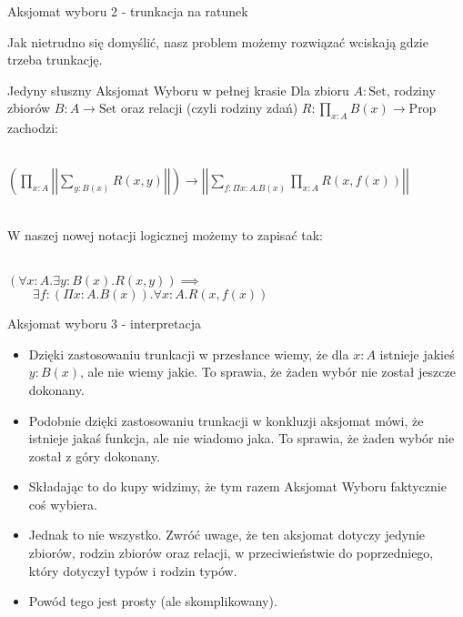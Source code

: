 \documentclass{beamer}
\newcommand{\Prop}{\text{Prop}}
\newcommand{\Set}{\text{Set}}
\begin{document}
\begin{frame}{Aksjomat wyboru 2 - trunkacja na ratunek}

Jak nietrudno się domyślić, nasz problem możemy rozwiązać wciskają gdzie trzeba trunkację.

\begin{block}{Jedyny słuszny Aksjomat Wyboru w pełnej krasie}
Dla zbioru $A : \Set$, rodziny zbiorów $B : A \to \Set$ oraz relacji (czyli rodziny zdań) $R : \prod_{x : A} B(x) \to \Prop$ zachodzi: \\~\

$\displaystyle
	\left(\prod_{x : A} \left|\left|\sum_{y : B(x)} R(x, y)\right|\right|\right) \to
	\left|\left|\sum_{f : \Pi x : A. B(x)} \prod_{x : A} R(x, f(x))\right|\right|
$ \\~\

W naszej nowej notacji logicznej możemy to zapisać tak: \\~\

$\displaystyle
	(\forall x : A. \exists y : B(x). R(x, y)) \implies
$ \\
$\displaystyle \qquad
	\exists f : (\Pi x : A. B(x)). \forall x : A. R(x, f(x))
$
\end{block}

\end{frame}

\begin{frame}{Aksjomat wyboru 3 - interpretacja}
\begin{itemize}
	\item Dzięki zastosowaniu trunkacji w przesłance wiemy, że dla $x : A$ istnieje jakieś $y : B(x)$, ale nie wiemy jakie. To sprawia, że żaden wybór nie został jeszcze dokonany.
	\item Podobnie dzięki zastosowaniu trunkacji w konkluzji aksjomat mówi, że istnieje jakaś funkcja, ale nie wiadomo jaka. To sprawia, że żaden wybór nie został z góry dokonany.
	\item Składając to do kupy widzimy, że tym razem Aksjomat Wyboru faktycznie coś wybiera.
	\item Jednak to nie wszystko. Zwróć uwage, że ten aksjomat dotyczy jedynie zbiorów, rodzin zbiorów oraz relacji, w przeciwieństwie do poprzedniego, który dotyczył typów i rodzin typów.
	\item Powód tego jest prosty (ale skomplikowany).
\end{itemize}
\end{frame}
\end{document}
